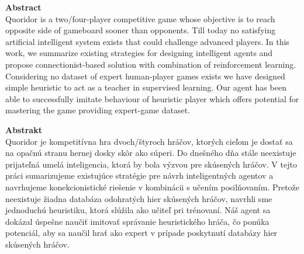 \vspace*{0.5cm}
\noindent
{\textbf{\Large{Abstract}}}
\vspace*{0.5cm}
\normalsize \\
Quoridor is a two/four-player competitive game whose objective is to reach
opposite side of gameboard sooner than opponents. Till today no satisfying
artificial intelligent system exists that could challenge advanced players.
In this work, we summarize existing strategies for designing intelligent agents
and propose connectionist-based solution with combination of reinforcement
learning. Considering no dataset of expert {human-player} games exists we have designed
simple heuristic to act as a teacher in supervised learning. Our agent has been
able to successfully imitate behaviour of heuristic player which offers
potential for mastering the game providing expert-game dataset.
\clearpage

\vspace*{0.5cm}
\noindent
{\textbf{\Large{Abstrakt}}}
\vspace*{0.5cm}
\normalsize \\
Quoridor je kompetitívna hra dvoch/štyroch hráčov, ktorých cieľom je dostať sa
na opačnú stranu hernej dosky skôr ako súperi. Do dnešného dňa stále neexistuje
prijateľná umelá inteligencia, ktorá by bola výzvou pre skúsených hráčov.
V tejto práci sumarizujeme existujúce stratégie pre návrh inteligentných
agentov a navrhujeme konekcionistické riešenie v kombinácii s učením
posilňovaním. Pretože neexistuje žiadna databáza odohratých hier skúsených
hráčov, navrhli sme jednoduchú heuristiku, ktorá slúžila ako učiteľ
pri trénovaní. Náš agent sa dokázal úspešne naučiť imitovať správanie
heuristického hráča, čo ponúka potenciál, aby sa naučil hrať ako expert
v prípade poskytnutí databázy hier skúsených hráčov.
\clearpage
